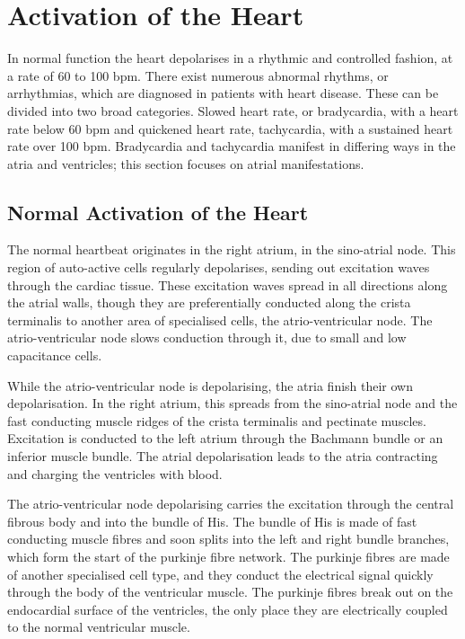 \section{Activation of the Heart}

In normal function the heart depolarises in a rhythmic and controlled fashion,
at a rate of 60 to 100 bpm.
There exist numerous abnormal rhythms, or arrhythmias, which are diagnosed in
patients with heart disease.
These can be divided into two broad categories.
Slowed heart rate, or bradycardia, with a heart rate below 60 bpm and quickened
heart rate, tachycardia, with a sustained heart rate over 100 bpm.
Bradycardia and tachycardia manifest in differing ways in the atria and
ventricles; this section focuses on atrial manifestations.

\subsection{Normal Activation of the Heart}

The normal heartbeat originates in the right atrium, in the sino-atrial node.
This region of auto-active cells regularly depolarises, sending out excitation
waves through the cardiac tissue.
These excitation waves spread in all directions along the atrial walls, though
they are preferentially conducted along the crista terminalis to another area of
specialised cells, the atrio-ventricular node.
The atrio-ventricular node slows conduction through it, due to small and low
capacitance cells.

While the atrio-ventricular node is depolarising, the atria finish their own
depolarisation.
In the right atrium, this spreads from the sino-atrial node and the fast
conducting muscle ridges of the crista terminalis and pectinate muscles.
Excitation is conducted to the left atrium through the Bachmann bundle or
an inferior muscle bundle.
The atrial depolarisation leads to the atria contracting and charging the
ventricles with blood.

The atrio-ventricular node depolarising carries the excitation through the
central fibrous body and into the bundle of His.
The bundle of His is made of fast conducting muscle fibres and soon splits into
the left and right bundle branches, which form the start of the purkinje fibre
network.
The purkinje fibres are made of another specialised cell type, and they conduct
the electrical signal quickly through the body of the ventricular muscle.
The purkinje fibres break out on the endocardial surface of the ventricles, the
only place they are electrically coupled to the normal ventricular muscle.

